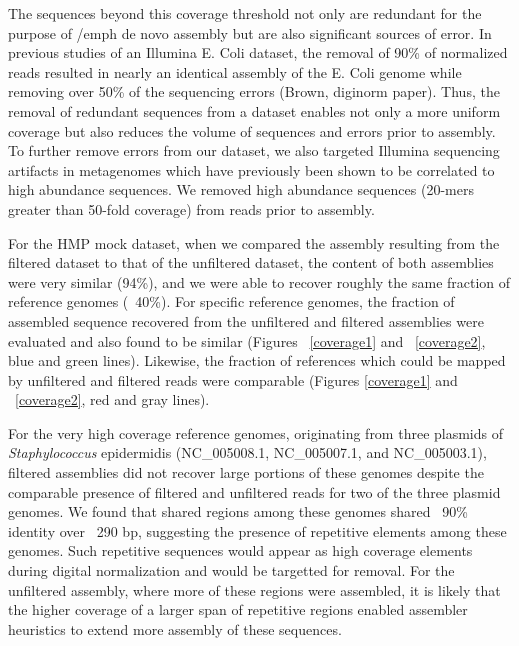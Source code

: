 \documentclass[11pt]{article} %
\begin{document}
The sequences beyond this coverage threshold not only are redundant for the purpose of /emph de novo assembly but are also significant sources of error.  In previous studies of an Illumina E. Coli dataset, the removal of 90\% of normalized reads resulted in nearly an identical assembly of the E. Coli genome while removing over 50\% of the sequencing errors (Brown, diginorm paper).  Thus, the removal of redundant sequences from a dataset enables not only a more uniform coverage but also reduces the volume of sequences and errors prior to assembly.  To further remove errors from our dataset, we also targeted Illumina sequencing artifacts in metagenomes which have previously been shown to be correlated to high abundance sequences.  We removed high abundance sequences (20-mers greater than 50-fold coverage) from reads prior to assembly. 

For the HMP mock dataset, when we compared the assembly resulting from the filtered dataset to that of the unfiltered dataset, the content of both assemblies were very similar (94\%), and we were able to recover roughly the same fraction of reference genomes (~40\%).  For specific reference genomes, the fraction of assembled sequence recovered from the unfiltered and filtered assemblies were evaluated and also found to be similar (Figures ~\ref{coverage1} and ~\ref{coverage2}, blue and green lines).  Likewise, the fraction of references which could be mapped by unfiltered and filtered reads were comparable (Figures \ref{coverage1} and ~\ref{coverage2}, red and gray lines).  

For the very high coverage reference genomes, originating from three plasmids of \emph{Staphylococcus} epidermidis (NC\_005008.1, NC\_005007.1, and NC\_005003.1), filtered assemblies did not recover large portions of these genomes despite the comparable presence of filtered and unfiltered reads for two of the three plasmid genomes.  We found that shared regions among these genomes shared ~90\% identity over ~290 bp, suggesting the presence of repetitive elements among these genomes.  Such repetitive sequences would appear as high coverage elements during digital normalization and would be targetted for removal.  For the unfiltered assembly, where more of these regions were assembled, it is likely that the higher coverage of a larger span of repetitive regions enabled assembler heuristics to extend more assembly of these sequences.  
\end{document}
